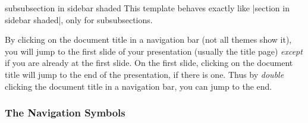 \begin{element}{subsubsection in sidebar shaded}\yes\no\no
  This template behaves exactly like |section in sidebar shaded|, only for subsubsections.
\end{element}

By clicking on the document title in a navigation bar (not all themes show it), you will jump to the first slide of your presentation (usually the title page) \emph{except} if you are already at the first slide. On the first slide, clicking on the document title will jump to the end of the presentation, if there is one. Thus by \emph{double} clicking the document title in a navigation bar, you can jump to the end.

\subsubsection{The Navigation Symbols}
\label{section-navigation-symbols}
\begingroup
\makeatletter
\newcommand{\beamer@linkspace}[1]{}
\renewcommand{\Acrobatmenu}[2]{}
\renewcommand{\usebeamercolor}[2][]{\color{.!20}}
\makeatother

